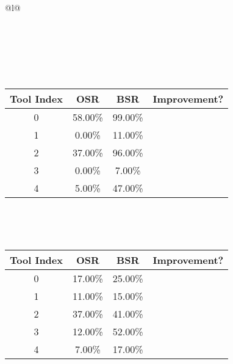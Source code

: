 \begin{longtable}{@{}l@{}}
\caption{Tool selection results for qwen3 on ollama. \\ \textbf{Overall Improvement: 95.56\%}} \\
\toprule
{} \\
\midrule
\endfirsthead
\toprule
{} \\
\midrule
\endhead
\bottomrule
\endfoot
\begin{minipage}{\textwidth}
\centering{}\\[0.8ex]
\begin{tabular}{|c|c|c|c|} \hline
\textbf{Tool Index} & \textbf{OSR} & \textbf{ BSR} & \textbf{Improvement?} \\ \hline
0 & 58.00\% & 99.00\% & \textcolor{green}{\ding{51}} \\ \hline
1 & 0.00\% & 11.00\% & \textcolor{green}{\ding{51}} \\ \hline
2 & 37.00\% & 96.00\% & \textcolor{green}{\ding{51}} \\ \hline
3 & 0.00\% & 7.00\% & \textcolor{green}{\ding{51}} \\ \hline
4 & 5.00\% & 47.00\% & \textcolor{green}{\ding{51}} \\ \hline
\end{tabular}
\end{minipage}\\[2ex]
\begin{minipage}{\textwidth}
\centering\vspace{2ex}
\\[0.8ex]
\begin{tabular}{|c|c|c|c|} \hline
\textbf{Tool Index} & \textbf{OSR} & \textbf{ BSR} & \textbf{Improvement?} \\ \hline
0 & 17.00\% & 25.00\% & \textcolor{green}{\ding{51}} \\ \hline
1 & 11.00\% & 15.00\% & \textcolor{green}{\ding{51}} \\ \hline
2 & 37.00\% & 41.00\% & \textcolor{green}{\ding{51}} \\ \hline
3 & 12.00\% & 52.00\% & \textcolor{green}{\ding{51}} \\ \hline
4 & 7.00\% & 17.00\% & \textcolor{green}{\ding{51}} \\ \hline
\end{tabular}

\end{minipage}
\end{longtable}

